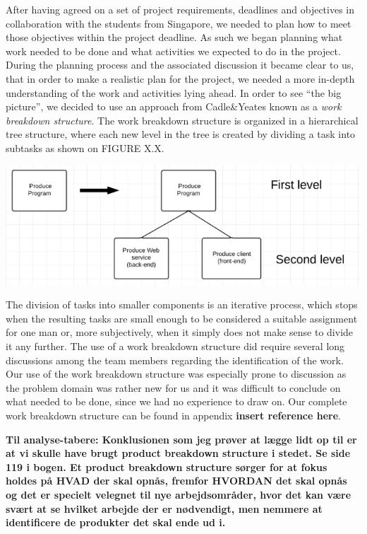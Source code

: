 After having agreed on a set of project requirements, deadlines and objectives in collaboration with the students from Singapore, we needed to plan how to meet those objectives within the project deadline. As such we began planning what work needed to be done and what activities we expected to do in the project.
During the planning process and the associated discussion it became clear to us, that in order to make a realistic plan for the project, we needed a more in-depth understanding of the work and activities lying ahead. In order to see “the big picture”, we decided to use an approach from Cadle\&Yeates \cite{caye} known as a \emph{work breakdown structure}. The work breakdown structure is organized in a hierarchical tree structure, where each new level in the tree is created by dividing a task into subtasks as shown on FIGURE X.X.

\includegraphics[scale=0.5]{./Empiri/Planning/img/wbslevels.png}
 
The division of tasks into smaller components is an iterative process, which stops when the resulting tasks are small enough to be considered a suitable assignment for one man or, more subjectively, when it simply does not make sense to divide it any further.
The use of a work breakdown structure did require several long discussions among the team members regarding the identification of the work. Our use of the work breakdown structure was especially prone to discussion as the problem domain was rather new for us and it was difficult to conclude on what needed to be done, since we had no experience to draw on.
Our complete work breakdown structure can be found in appendix \textbf{insert reference here}.

\textbf{Til analyse-tabere:
Konklusionen som jeg prøver at lægge lidt op til er at vi skulle have brugt product breakdown structure i stedet. Se side 119 i bogen.
Et product breakdown structure sørger for at fokus holdes på HVAD der skal opnås, fremfor HVORDAN det skal opnås og det er specielt velegnet til nye arbejdsområder, hvor det kan være svært at se hvilket arbejde der er nødvendigt, men nemmere at identificere de produkter det skal ende ud i.}

